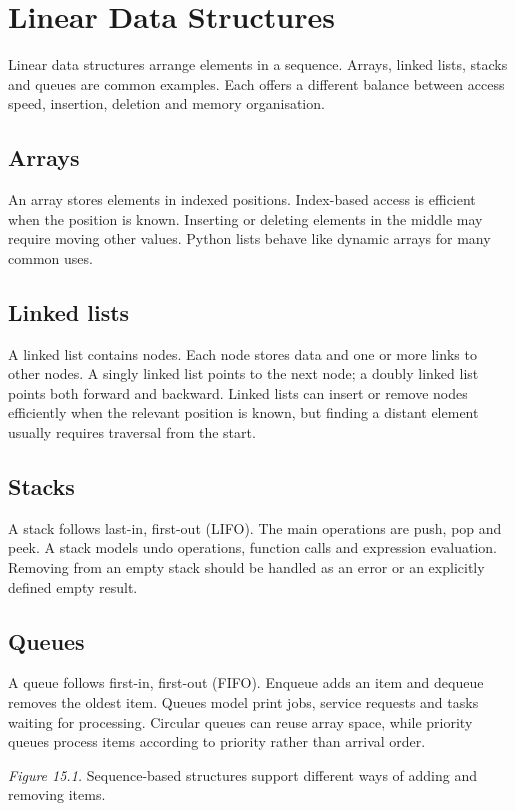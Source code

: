 \documentclass[11pt,openany,oneside]{book}
\begin{document}
\chapter{Linear Data Structures}
Linear data structures arrange elements in a sequence. Arrays, linked lists, stacks and queues are common examples. Each offers a different balance between access speed, insertion, deletion and memory organisation.

\section{Arrays}
An array stores elements in indexed positions. Index-based access is efficient when the position is known. Inserting or deleting elements in the middle may require moving other values. Python lists behave like dynamic arrays for many common uses.

\section{Linked lists}
A linked list contains nodes. Each node stores data and one or more links to other nodes. A singly linked list points to the next node; a doubly linked list points both forward and backward. Linked lists can insert or remove nodes efficiently when the relevant position is known, but finding a distant element usually requires traversal from the start.

\section{Stacks}
A stack follows last-in, first-out (LIFO). The main operations are push, pop and peek. A stack models undo operations, function calls and expression evaluation. Removing from an empty stack should be handled as an error or an explicitly defined empty result.

\section{Queues}
A queue follows first-in, first-out (FIFO). Enqueue adds an item and dequeue removes the oldest item. Queues model print jobs, service requests and tasks waiting for processing. Circular queues can reuse array space, while priority queues process items according to priority rather than arrival order.

\begin{center}
\end{center}
\textit{Figure 15.1.} Sequence-based structures support different ways of adding and removing items.
\end{document}
